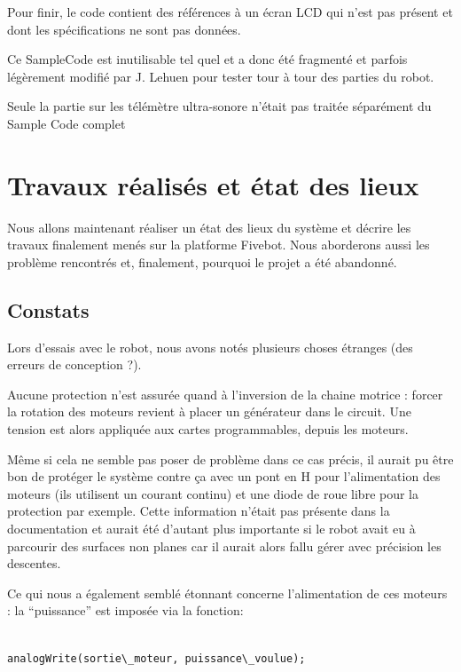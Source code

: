 \documentclass[a4paper]{report}
\begin{document}
Pour finir, le code contient des références à un écran LCD qui n'est pas présent et dont les spécifications ne sont pas données.

Ce SampleCode est inutilisable tel quel et a donc été fragmenté et parfois légèrement modifié par J. Lehuen pour tester tour à tour des parties du robot.

Seule la partie sur les télémètre ultra-sonore n'était pas traitée séparément du Sample Code complet


\section{Travaux réalisés et état des lieux%
  \label{travaux-realises-et-etat-des-lieux}%
}

Nous allons maintenant réaliser un état des lieux du système et décrire les travaux finalement menés sur la platforme Fivebot.
Nous aborderons aussi les problème rencontrés et, finalement, pourquoi le projet a été abandonné.


\subsection{Constats%
  \label{constats}%
}

Lors d'essais avec le robot, nous avons notés plusieurs choses étranges (des erreurs de conception ?).

Aucune protection n'est assurée quand à l'inversion de la chaine motrice : forcer la rotation des moteurs revient à placer un générateur dans le circuit.
Une tension est alors appliquée aux cartes programmables, depuis les moteurs.

Même si cela ne semble pas poser de problème dans ce cas précis, il aurait pu être bon de protéger le système contre ça avec un pont en H pour l'alimentation des moteurs (ils utilisent un courant continu) et une diode de roue libre pour la protection par exemple. Cette information n'était pas présente dans la documentation et aurait été d'autant plus importante si le robot avait eu à parcourir des surfaces non planes car il aurait alors fallu gérer avec précision les descentes.

Ce qui nous a également semblé étonnant concerne l'alimentation de ces moteurs : la ``puissance'' est imposée via la fonction:
%
\begin{verbatim}

analogWrite(sortie\_moteur, puissance\_voulue);

\end{verbatim}
\end{document}
